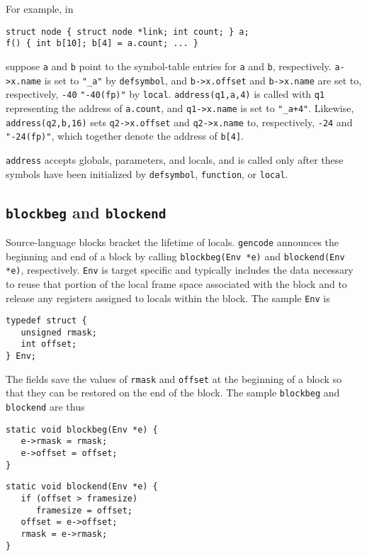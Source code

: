 For example, in
\begin{verbatim}
struct node { struct node *link; int count; } a;
f() { int b[10]; b[4] = a.count; ... }
\end{verbatim}
suppose \verb|a| and \verb|b| point to the symbol-table entries
for \verb|a| and \verb|b|, respectively.
\verb|a->x.name| is set to \verb|"_a"| by \verb|defsymbol|, and
\verb|b->x.offset| and \verb|b->x.name| are set to, respectively,
\verb|-40| \verb|"-40(fp)"| by \verb|local|.
\verb|address(q1,a,4)| is called with \verb|q1| representing the address
of \verb|a.count|, and \verb|q1->x.name| is set to \verb|"_a+4"|.
Likewise, \verb|address(q2,b,16)| sets \verb|q2->x.offset|
and \verb|q2->x.name| to, respectively, \verb|-24| and \verb|"-24(fp)"|,
which together denote the address of \verb|b[4]|.

\verb|address| accepts globals, parameters, and locals,
and is called only after these symbols have been initialized
by {\tt defsymbol}, {\tt function}, or {\tt local}.

\subsection{{\tt blockbeg} and \tt blockend}

\label{blockbeg}\label{blockend}
Source-language blocks bracket the lifetime of locals.
\verb|gencode| announces the beginning and end of a block
by calling \verb|blockbeg(Env *e)| and \verb|blockend(Env *e)|, respectively.
\verb|Env| is target specific and typically includes
the data necessary to reuse that portion of the local frame
space associated with the block
and to release any registers assigned to locals within the block.
The sample \verb|Env| is
\begin{verbatim}
typedef struct {
   unsigned rmask;
   int offset;
} Env;
\end{verbatim}
The fields save the values of \verb|rmask| and \verb|offset| at the beginning
of a block so that they can be restored on the end of the block.
The sample \verb|blockbeg| and \verb|blockend| are thus

\noindent
\begin{minipage}[t]{.5\textwidth}
\vspace{\parskip}
\begin{verbatim}
static void blockbeg(Env *e) {
   e->rmask = rmask;
   e->offset = offset;
}
\end{verbatim}
\vspace{\parskip}
\end{minipage}
\begin{minipage}[t]{.5\textwidth}
\vspace{\parskip}
\begin{verbatim}
static void blockend(Env *e) {
   if (offset > framesize)
      framesize = offset;
   offset = e->offset;
   rmask = e->rmask;
}
\end{verbatim}
\vspace{\parskip}
\end{minipage}


